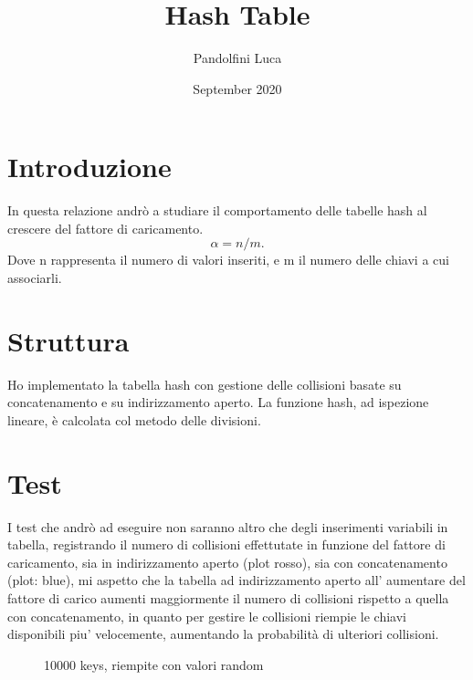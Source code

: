 \documentclass{article}
\title{Hash Table}
\author{Pandolfini Luca}
\date{September 2020}
\begin{document}
\maketitle

\section{Introduzione}
In  questa  relazione  andrò  a  studiare il comportamento delle tabelle hash al crescere del fattore di caricamento.
\begin{equation}
    \alpha=n/m.
\end{equation}
Dove n rappresenta il numero di valori inseriti, e m il numero delle chiavi a cui associarli.

\section{Struttura}
Ho implementato la tabella hash con gestione delle collisioni basate su concatenamento e su indirizzamento aperto. La funzione hash, ad ispezione lineare, è calcolata col metodo delle divisioni.

\section{Test}
I test che andrò ad eseguire non saranno altro che degli inserimenti variabili in tabella, registrando il numero di collisioni effettutate in funzione del fattore di caricamento, sia in indirizzamento aperto (plot rosso), sia con concatenamento (plot: blue), mi aspetto che la tabella ad indirizzamento aperto all' aumentare del fattore di carico aumenti maggiormente il numero di collisioni rispetto a quella con concatenamento, in quanto per gestire le collisioni riempie le chiavi disponibili piu' velocemente, aumentando la probabilità di ulteriori collisioni.

\newpage

\begin{figure}[]
    \centering
    \caption{10000 keys, riempite con valori random}
\end{figure}
\end{document}

